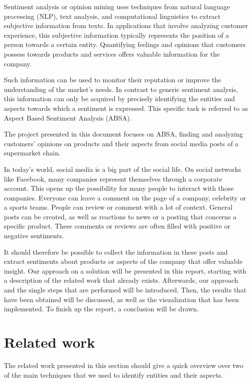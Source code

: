 \documentclass[10pt,a4paper]{article}
\begin{document}
	Sentiment analysis or opinion mining uses techniques from natural language processing (NLP), text analysis, and computational linguistics to extract subjective information from texts. In applications that involve analyzing customer experience, this subjective information typically represents the position of a person towards a certain entity. Quantifying feelings and opinions that customers possess towards products and services offers valuable information for the company. 
	
	Such information can be used to monitor their reputation or improve the understanding of the market's needs. In contrast to generic sentiment analysis, this information can only be acquired by precisely identifying the entities and aspects towards which a sentiment is expressed. This specific task is referred to as  Aspect Based Sentiment Analysis (ABSA).
	
	The project presented in this document focuses on ABSA, finding and analyzing customers' opinions on products and their aspects from social media posts of a supermarket chain.
	
	 In today's world, social media is a big part of the social life. On social networks like Facebook, many companies represent themselves through a corporate account. This opens up the possibility for many people to interact with those companies. Everyone can leave a comment on the page of a company, celebrity or a sports teams. People can review or comment with a lot of context. General posts can be created, as well as reactions to news or a posting that concerns a specific product. These comments or reviews are often filled with positive or negative sentiments. 
	 
	 It should therefore be possible to collect the information in these posts and extract sentiments about products or aspects of the company that offer valuable insight. Our approach on a solution will be presented in this report, starting with a description of the related work that already exists. Afterwards, our approach and the single steps that are performed will be introduced. Then, the results that have been obtained will be discussed, as well as the visualization that has been implemented. To finish up the report, a conclusion will be drawn.
		
	\section{Related work}
	The related work presented in this section should give a quick overview over two of the main techniques that we used to identify entities and their aspects.
		
\end{document}
